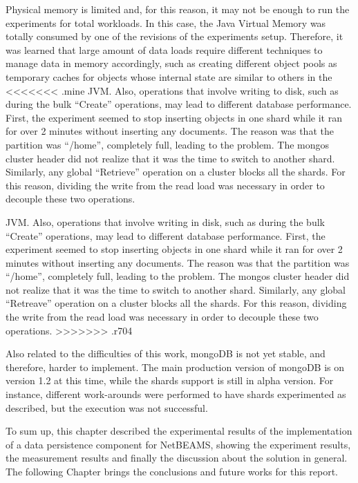 Physical memory is limited and, for this reason, it may not be enough to run
the experiments for total workloads. In this case, the Java Virtual Memory was
totally consumed by one of the revisions of the experiments setup. Therefore, 
it was learned that large amount of data loads require different techniques to
manage data in memory accordingly, such as creating different object pools as
temporary caches for objects whose internal state are similar to others in the
<<<<<<< .mine
JVM. Also, operations that involve writing to disk, such as during the bulk
``Create'' operations, may lead to different database performance. First, the
experiment seemed to stop inserting objects in one shard while it ran for over
2 minutes without inserting any documents. The reason was that the partition
was ``/home'', completely full, leading to the problem. The mongos cluster
header did not realize that it was the time to switch to another shard.
Similarly, any global ``Retrieve'' operation on a cluster blocks all the
shards. For this reason, dividing the write from the read load was necessary in
order to decouple these two operations.

JVM. Also, operations that involve writing in disk, such as during the bulk
``Create'' operations, may lead to different database performance. First, the
experiment seemed to stop inserting objects in one shard while it ran for over
2 minutes without inserting any documents. The reason was that the partition
was ``/home'', completely full, leading to the problem. The mongos cluster
header did not realize that it was the time to switch to another shard.
Similarly, any global ``Retreave'' operation on a cluster blocks all the
shards. For this reason, dividing the write from the read load was necessary in
order to decouple these two operations.
>>>>>>> .r704

Also related to the difficulties of this work, mongoDB is not yet stable, and
therefore, harder to implement. The main production version of mongoDB
is on version 1.2 at this time, while the shards support is still in alpha
version. For instance, different work-arounds were performed to have shards
experimented as described, but the execution was not successful.

To sum up, this chapter described the experimental results of the
implementation of a data persistence component for NetBEAMS, showing the
experiment results, the measurement results and finally the discussion about
the solution in general. The following Chapter brings the conclusions and
future works for this report.
